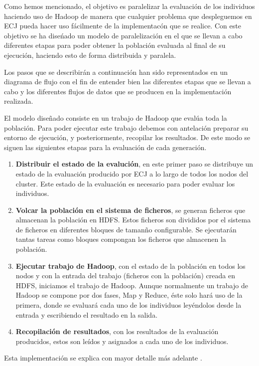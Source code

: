 Como hemos mencionado, el objetivo es paralelizar la evaluaci\'on de los individuos haciendo uso de Hadoop de manera que cualquier problema que despleguemos en ECJ pueda hacer uso fácilmente de la implementac\'on que se realice. Con este objetivo se ha dise\'nado un modelo de paralelizaci\'on en el que se llevan a cabo diferentes etapas para poder obtener la poblaci\'on evaluada al final de su ejecuci\'on, haciendo esto de forma distribuida y paralela.

Los pasos que se describir\'an a continuaci\'on han sido representados en un diagrama de flujo  con el fin de entender bien las diferentes etapas que se llevan a cabo y los diferentes flujos de datos que se producen en la implementaci\'on realizada.


El modelo dise\~nado consiste en un trabajo de Hadoop que eval\'ua toda la población. Para poder ejecutar este trabajo debemos con antelaci\'on preparar su entorno de ejecuci\'on, y posteriormente, recopilar los resultados. De este modo se siguen las siguientes etapas para la evaluaci\'on de cada generaci\'on.

\begin{enumerate}
	\item \textbf{Distribuir el estado de la evaluci\'on}, en este primer paso se distribuye un estado de la evaluaci\'on producido por ECJ a lo largo de todos los nodos del cluster. Este estado de la evaluaci\'on es necesario para poder evaluar los individuos.
	\item \textbf{Volcar la poblaci\'on en el sistema de ficheros}, se generan ficheros que almacenan la poblaci\'on en HDFS. Estos ficheros son divididos por el sistema de ficheros en diferentes bloques de taman\~no configurable. Se ejecutar\'an tantas tareas como bloques compongan los ficheros que almacenen la poblaci\'on.
	\item \textbf{Ejecutar trabajo de Hadoop}, con el estado de la poblaci\'on en todos los nodos y con la entrada del trabajo (ficheros con la poblaci\'on) creada en HDFS, iniciamos el trabajo de Hadoop. Aunque normalmente un trabajo de Hadoop se compone por dos fases, Map y Reduce, \'este solo har\'a uso de la primera, donde se evaluar\'a cada uno de los individuos leyéndolos desde la entrada y escribiendo el resultado en la salida.
	\item \textbf{Recopilaci\'on de resultados}, con los resultados de la evaluaci\'on producidos, estos son leídos y asignados a cada uno de los individuos.
\end{enumerate}

Esta implementación se explica con mayor detalle m\'as adelante . 